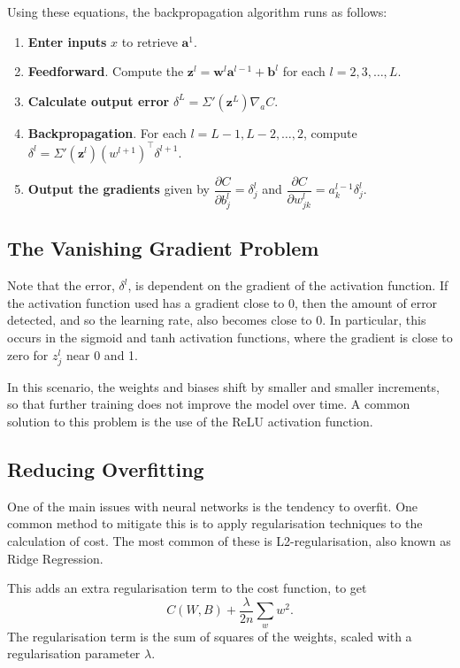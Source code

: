 \documentclass[honours,12pt]{unswthesis}
\numberwithin{equation}{section}
\begin{document}
Using these equations, the backpropagation algorithm runs as follows:
\begin{enumerate}
	\item \textbf{Enter inputs }$x$ to retrieve $\mathbf{a}^1$.
	\item \textbf{Feedforward}. Compute the $\mathbf{z}^l = \mathbf{w}^l\mathbf{a}^{l-1} + \mathbf{b}^l$ for each $l = 2, 3,\ldots,L$.
	\item \textbf{Calculate output error }$\delta^L = \Sigma'(\mathbf{z}^L)\nabla_aC$.
	\item \textbf{Backpropagation}. For each $l = L-1, L-2, \ldots, 2$, compute $\delta^l =  \Sigma'(\mathbf{z}^l)(w^{l+1})^\top\delta^{l+1}$.
	\item \textbf{Output the gradients} given by $\dfrac{\partial C}{\partial b_j^l} = \delta_j^l$ and $\dfrac{\partial C}{\partial w_{jk}^l} = a_k^{l-1}\delta_j^l$.
\end{enumerate}


\subsection{The Vanishing Gradient Problem}
Note that the error, $\delta^l$, is dependent on the gradient of the activation function. If the activation function used has a gradient close to 0, then the amount of error detected, and so the learning rate, also becomes close to 0. In particular, this occurs in the sigmoid and tanh activation functions, where the gradient is close to zero for $z_j^l$ near 0 and 1.

In this scenario, the weights and biases shift by smaller and smaller increments, so that further training does not improve the model over time. A common solution to this problem is the use of the ReLU activation function.


\subsection{Reducing Overfitting}


One of the main issues with neural networks is the tendency to overfit. One common method to mitigate this is to apply regularisation techniques to the calculation of cost. The most common of these is L2-regularisation, also known as Ridge Regression.

This adds an extra regularisation term to the cost function, to get
\[
	C(W,B) + \dfrac{\lambda}{2n}\sum_{w}w^2.
\]
The regularisation term is the sum of squares of the weights, scaled with a regularisation parameter $\lambda$. 
\end{document}
